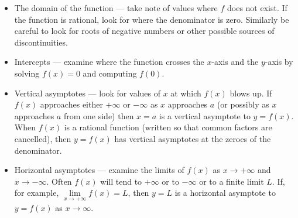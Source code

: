 \begin{itemize}
 \item The domain of the function --- take note of values where $f$ does not exist. If
the function is rational, look for where the denominator is zero. Similarly be careful
to look for roots of negative numbers or other possible sources of discontinuities.

\item Intercepts --- examine where the function crosses the $x$-axis and the $y$-axis
by solving $f(x)=0$ and computing $f(0)$.

\item Vertical asymptotes --- look for values of $x$ at which $f(x)$ blows up. If $f(x)$
approaches either $+\infty$ or $-\infty$ as $x$ approaches $a$ (or possibly as $x$
approaches $a$ from one side) then $x=a$ is a vertical asymptote to $y=f(x)$. When $f(x)$
is a rational function (written so that common factors are cancelled), then $y=f(x)$ has
vertical asymptotes at the zeroes of the denominator.

\item Horizontal asymptotes --- examine the limits of $f(x)$ as $x\to+\infty$ and
$x\to-\infty$. Often $f(x)$ will tend to $+\infty$ or to $-\infty$ or to a finite limit
$L$. If, for example, $\lim\limits_{x\rightarrow+\infty}f(x)=L$, then $y=L$
is a horizontal asymptote to $y=f(x)$ as $x\rightarrow\infty$.
\end{itemize}

